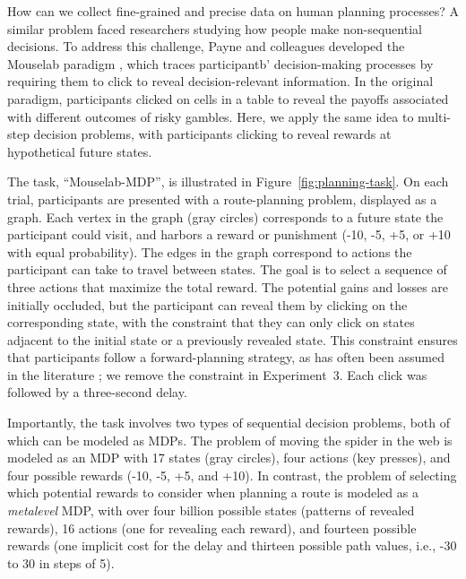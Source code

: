 How can we collect fine-grained and precise data on human planning processes? A similar problem faced researchers studying how people make non-sequential decisions. To address this challenge, Payne and colleagues developed the Mouselab paradigm \citep{payne1976task,payne1988adaptive}, which traces participantb' decision-making processes by requiring them to click to reveal decision-relevant information. In the original paradigm, participants clicked on cells in a table to reveal the payoffs associated with different outcomes of risky gambles. Here, we apply the same idea to multi-step decision problems, with participants clicking to reveal rewards at hypothetical future states.


The task, ``Mouselab-MDP'', is illustrated in Figure~\ref{fig:planning-task}. On each trial, participants are presented with a route-planning problem, displayed as a graph. Each vertex in the graph (gray circles) corresponds to a future state the participant could visit, and harbors a reward or punishment (-10, -5, +5, or +10 with equal probability). The edges in the graph correspond to actions the participant can take to travel between states. The goal is to select a sequence of three actions that maximize the total reward. The potential gains and losses are initially occluded, but the participant can reveal them by clicking on the corresponding state, with the constraint that they can only click on states adjacent to the initial state or a previously revealed state. This constraint ensures that participants follow a forward-planning strategy, as has often been assumed in the literature \citep{huys2015interplay,huys2012bonsai,vanopheusden2017computational,macgregor2001information,keramati2016adaptive,krusche2018adaptive,snider2015prospective}; we remove the constraint in Experiment~3. Each click was followed by a three-second delay.

Importantly, the task involves two types of sequential decision problems, both of which can be modeled as MDPs. The problem of moving the spider in the web is modeled as an MDP with 17 states (gray circles), four actions (key presses), and four possible rewards (-10, -5, +5, and +10). In contrast, the problem of selecting which potential rewards to consider when planning a route is modeled as a \emph{metalevel} MDP, with over four billion possible states (patterns of revealed rewards), 16 actions (one for revealing each reward), and fourteen possible rewards (one implicit cost for the delay and thirteen possible path values, i.e., -30 to 30 in steps of 5).

